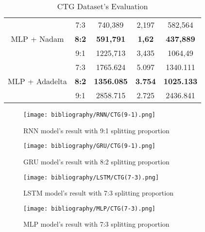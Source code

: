 \documentclass{ieeeojies}
\begin{document}
\begin{table}[H]
\begin{tabular}{|c|c|c|c|c|}
         \hline
         \multirow{3}{*}{MLP + Nadam} 
         & 7:3 & 740,389 & 2,197 & 582,564 \\ 
         & \textbf{8:2} & \textbf{591,791} & \textbf{1,62} & \textbf{437,889} \\ 
         & 9:1 & 1225,713 & 3,435 & 1064,49 \\
         \hline
         \multirow{3}{*}{MLP + Adadelta} 
         & 7:3 & 1765.624 &  5.097 &  1340.111 \\ 
         & \textbf{8:2} & \textbf{1356.085} & \textbf{3.754} &  \textbf{1025.133} \\ 
         & 9:1 & 2858.715 & 2.725 & 2436.841\\
         \hline
    \end{tabular}
    \caption{CTG Dataset's Evaluation}
    \label{vcbresult}
\end{table}

\begin{figure}[H]
  \centering
  \begin{minipage}{0.7\linewidth}
    \centering
    \texttt{[image: bibliography/RNN/CTG(9-1).png]}
    \caption{RNN model's result with 9:1 splitting proportion}
    \label{fig8}
  \end{minipage}
\end{figure}

\begin{figure}[H]
  \centering
  \begin{minipage}{0.7\linewidth}
    \centering
    \texttt{[image: bibliography/GRU/CTG(9-1).png]}
    \caption{GRU model's result with 8:2 splitting proportion}
    \label{fig8}
  \end{minipage}
\end{figure}

\begin{figure}[H]
  \centering
  \begin{minipage}{0.7\linewidth}
    \centering
    \texttt{[image: bibliography/LSTM/CTG(7-3).png]}
    \caption{LSTM model's result with 7:3 splitting proportion}
    \label{fig8}
  \end{minipage}
\end{figure}

\begin{figure}[H]
  \centering
  \begin{minipage}{0.7\linewidth}
    \centering
    \texttt{[image: bibliography/MLP/CTG(7-3).png]}
    \caption{MLP model's result with 7:3 splitting proportion}
    \label{fig8}
  \end{minipage}
\end{figure}
\end{document}
